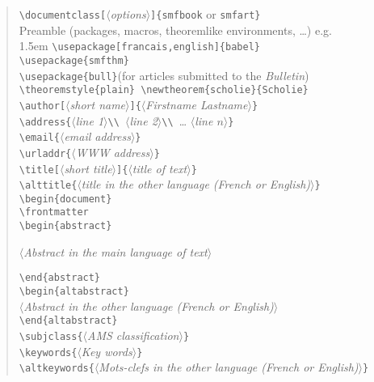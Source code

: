 \documentclass[11pt,english]{smfart}
\def\meta#1{$\langle${\it #1}$\rangle$}
\begin{document}
\begin{verse}
\verb|\documentclass[|\meta{options}\verb|]{smfbook| or \verb|smfart}|\\
Preamble (packages, macros, theoremlike environments, \ldots) e.g.\\
{\advance\leftskip 1.5em
\verb|\usepackage[francais,english]{babel}| \\
\verb|\usepackage{smfthm}|\\
\verb|\usepackage{bull}|\quad (for articles submitted to the \textsl{Bulletin})\\
\verb|\theoremstyle{plain} \newtheorem{scholie}{Scholie}|\\
}
\smallskip
\verb|\author[|\meta{short name}\verb|]{|\meta{Firstname Lastname}\verb|}| \\
\verb|\address{|\meta{line 1}\verb|\\ |\meta{line 2}\verb|\\ |\dots
\meta{line $n$}\verb|}| \\
\verb|\email{|\meta{email address}\verb|}| \\
\verb|\urladdr{|\meta{WWW address}\verb|}|\\
\smallskip
\verb|\title[|\meta{short title}\verb|]{|\meta{title of text}\verb|}| \\
\verb|\alttitle{|\meta{title in the other language
    (French or English)}\verb|}| \\
\smallskip
\verb|\begin{document}|\\
\verb|\frontmatter|\\
\smallskip
\verb|\begin{abstract}|\par\nopagebreak\noindent
\quad\meta{Abstract in the main language of text}\par\nopagebreak\noindent
\verb|\end{abstract}|\\ \smallskip 
\verb|\begin{altabstract}|\\
\quad\meta{Abstract in the other language (French or English)}\\
\verb|\end{altabstract}| \\
\smallskip
\verb|\subjclass{|\meta{AMS classification}\verb|}| \\
\verb|\keywords{|\meta{Key words}\verb|}| \\
\verb|\altkeywords{|\meta{Mots-clefs in the other language (French or English)}\verb|}| \\

\end{verse}
\end{document}
